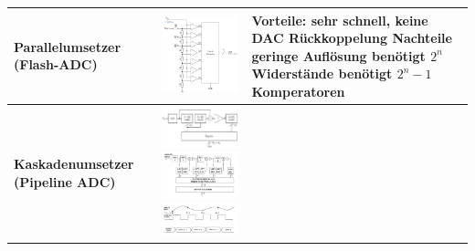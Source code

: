 \begin{longtable}{|>{\bfseries}p{4cm}|p{6cm}|p{8cm}|}
  \hline
    Parallelumsetzer (Flash-ADC) &
    \includegraphics[width=5cm, valign=t]{pictures/parallelADC} &
    \textbf{Vorteile}:\newline
    sehr schnell, keine DAC Rückkoppelung\newline
    \textbf{Nachteile}\newline
    geringe Auflösung\newline
    benötigt $2^n$ Widerstände \newline
    benötigt $2^n-1$ Komperatoren
   	\\
  \hline
    Kaskadenumsetzer (Pipeline ADC) &
    \includegraphics[width=5cm, valign=t]{pictures/kaskaden} \newline
    \includegraphics[width=5cm, valign=t]{pictures/kaskaden_fehlerkorrektur.png} \newline 
    \includegraphics[width=5cm, valign=t]{pictures/latenz}&
    

\end{longtable}
